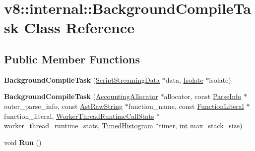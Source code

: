 \hypertarget{classv8_1_1internal_1_1BackgroundCompileTask}{}\section{v8\+:\+:internal\+:\+:Background\+Compile\+Task Class Reference}
\label{classv8_1_1internal_1_1BackgroundCompileTask}
\subsection*{Public Member Functions}
\begin{DoxyCompactItemize}
\item 
\mbox{\label{classv8_1_1internal_1_1BackgroundCompileTask_a335f97860ef5a6c20851f6ebd24f2043}} 
{\bfseries Background\+Compile\+Task} (\mbox{\hyperlink{structv8_1_1internal_1_1ScriptStreamingData}{Script\+Streaming\+Data}} $\ast$data, \mbox{\hyperlink{classv8_1_1internal_1_1Isolate}{Isolate}} $\ast$isolate)
\item 
\mbox{\label{classv8_1_1internal_1_1BackgroundCompileTask_a22fb40c4f36e18f1cc36edc99c10eb9c}} 
{\bfseries Background\+Compile\+Task} (\mbox{\hyperlink{classv8_1_1internal_1_1AccountingAllocator}{Accounting\+Allocator}} $\ast$allocator, const \mbox{\hyperlink{classv8_1_1internal_1_1ParseInfo}{Parse\+Info}} $\ast$outer\+\_\+parse\+\_\+info, const \mbox{\hyperlink{classv8_1_1internal_1_1AstRawString}{Ast\+Raw\+String}} $\ast$function\+\_\+name, const \mbox{\hyperlink{classv8_1_1internal_1_1FunctionLiteral}{Function\+Literal}} $\ast$function\+\_\+literal, \mbox{\hyperlink{classv8_1_1internal_1_1WorkerThreadRuntimeCallStats}{Worker\+Thread\+Runtime\+Call\+Stats}} $\ast$worker\+\_\+thread\+\_\+runtime\+\_\+stats, \mbox{\hyperlink{classv8_1_1internal_1_1TimedHistogram}{Timed\+Histogram}} $\ast$timer, \mbox{\hyperlink{classint}{int}} max\+\_\+stack\+\_\+size)
\item 
\mbox{\label{classv8_1_1internal_1_1BackgroundCompileTask_a6da0ea802adf4a21acd28b10c76d2011}} 
void {\bfseries Run} ()
\item 
\mbox{\label{classv8_1_1internal_1_1BackgroundCompileTask_a1f572653e0d345f7a459ad5a607b5997}} 

\end{DoxyCompactItemize}

